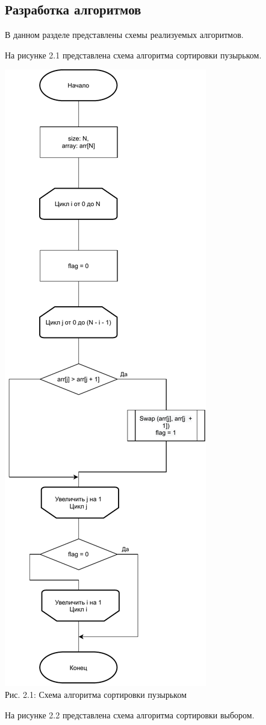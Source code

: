 \documentclass[12pt,a4paper]{article}
\numberwithin{equation}{section}
\begin{document}
\subsection{Разработка алгоритмов} %
В данном разделе представлены схемы реализуемых алгоритмов.

На рисунке 2.1 представлена схема алгоритма сортировки пузырьком.\\
\begin{center}	
	\includegraphics[width=.4\linewidth]{src/schemas/bubbleSort}\\
	Рис. 2.1: Схема алгоритма сортировки пузырьком
\end{center}
\clearpage
На рисунке 2.2 представлена схема алгоритма сортировки выбором.\\
\end{document}
